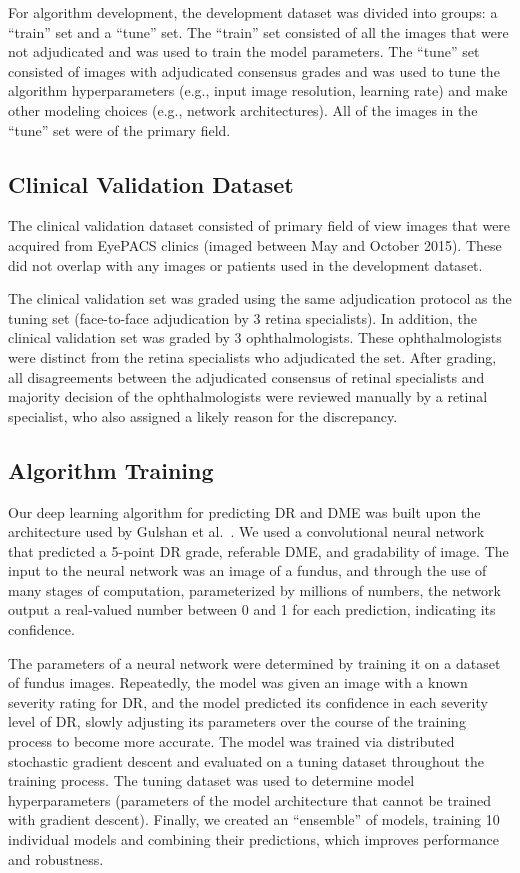 \documentclass{llncs}
\begin{document}
For algorithm development, the development dataset was divided into groups: a ``train'' set and a ``tune'' set. The ``train'' set consisted of all the images that were not adjudicated and was used to train the model parameters. The ``tune'' set consisted of images with adjudicated consensus grades and was used to tune the algorithm hyperparameters (e.g., input image resolution, learning rate) and make other modeling choices (e.g., network architectures). All of the images in the ``tune'' set were of the primary field.

\subsection{Clinical Validation Dataset}
The clinical validation dataset consisted of primary field of view images that were acquired from EyePACS clinics (imaged between May and October 2015). These did not overlap with any images or patients used in the development dataset.

The clinical validation set was graded using the same adjudication protocol as the tuning set (face-to-face adjudication by 3 retina specialists). In addition, the clinical validation set was graded by 3 ophthalmologists. These ophthalmologists were distinct from the retina specialists who adjudicated the set. After grading, all disagreements between the adjudicated consensus of retinal specialists and majority decision of the ophthalmologists were reviewed manually by a retinal specialist, who also assigned a likely reason for the discrepancy.

\subsection{Algorithm Training}
Our deep learning algorithm for predicting DR and DME was built upon the architecture used by Gulshan et al.~\cite{gulshan2016development}. We used a convolutional neural network~\cite{lecun1998gradient} that predicted a 5-point DR grade, referable DME, and gradability of image. The input to the neural network was an image of a fundus, and through the use of many stages of computation, parameterized by millions of numbers, the network output a real-valued number between 0 and 1 for each prediction, indicating its confidence.

The parameters of a neural network were determined by training it on a dataset of fundus images. Repeatedly, the model was given an image with a known severity rating for DR, and the model predicted its confidence in each severity level of DR, slowly adjusting its parameters over the course of the training process to become more accurate. The model was trained via distributed stochastic gradient descent and evaluated on a tuning dataset throughout the training process. The tuning dataset was used to determine model hyperparameters (parameters of the model architecture that cannot be trained with gradient descent). Finally, we created an ``ensemble'' of models, training 10 individual models and combining their predictions, which improves performance and robustness.
\end{document}

